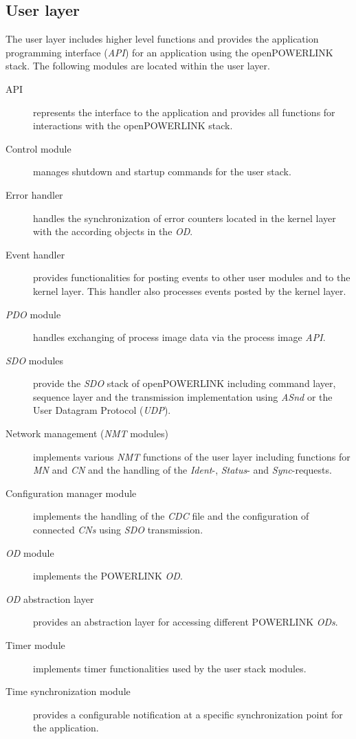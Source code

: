 \subsection{User layer}
\label{sec:oplk_architecture_user}

The user layer includes higher level functions and provides the application programming interface (\emph{API}) for an application using the openPOWERLINK stack.
The following modules are located within the user layer. \cite[openPOWERLINK User Layer]{openpowerlink_doc}

\begin{description}
    \item[API] represents the interface to the application and provides all functions for interactions with the openPOWERLINK stack.
    \item[Control module] manages shutdown and startup commands for the user stack.
    \item[Error handler] handles the synchronization of error counters located in the kernel layer with the according objects in the \emph{OD}.
    \item[Event handler] provides functionalities for posting events to other user modules and to the kernel layer.
    This handler also processes events posted by the kernel layer.
    \item[\emph{PDO} module] handles exchanging of process image data via the process image \emph{API}.
    \item[\emph{SDO} modules] provide the \emph{SDO} stack of openPOWERLINK including command layer, sequence layer and the transmission implementation using \emph{ASnd} or the User Datagram Protocol (\emph{UDP}).
    \item[Network management (\emph{NMT} modules)] implements various \emph{NMT} functions of the user layer including functions for \emph{MN} and \emph{CN} and the handling of the \emph{Ident}-, \emph{Status}- and \emph{Sync}-requests.
    \item[Configuration manager module] implements the handling of the \emph{CDC} file and the configuration of connected \emph{CNs} using \emph{SDO} transmission.
    \item[\emph{OD} module] implements the POWERLINK \emph{OD}.
    \item[\emph{OD} abstraction layer] provides an abstraction layer for accessing different POWERLINK \emph{ODs}.
    \item[Timer module] implements timer functionalities used by the user stack modules.
    \item[Time synchronization module] provides a configurable notification at a specific synchronization point for the application.
\end{description}

